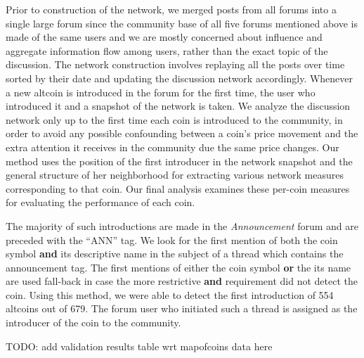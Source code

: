Prior to construction of the network, we merged posts from all forums into a
single large forum since the community base of all five forums mentioned
above is made of the same users and we are mostly concerned about influence and
aggregate information flow among users, rather than the exact topic of the discussion.
The network construction involves replaying all the posts over time sorted by their date and updating the
discussion network accordingly. Whenever a new altcoin is introduced
in the forum for the first time, the user who introduced it and a snapshot of the network is taken. 
We analyze the discussion network only up to the first time each coin is introduced to the community, in order to avoid any possible confounding between a coin's price movement and the extra attention it receives in the community due the same price changes. Our method uses the position of the first introducer in the network snapshot and the general structure of her neighborhood for extracting various network measures corresponding to that coin. Our final analysis examines these per-coin measures for evaluating the performance of each coin.



The  majority of such introductions are made in the \textit{Announcement} forum and are preceded with the ``ANN'' tag. We look for the first mention of both the coin symbol \textbf{and} its descriptive name in the subject of a thread which contains the announcement tag. The first mentions of either the coin symbol \textbf{or} the its name are used fall-back in case the more restrictive \textbf{and} requirement did not detect the coin. 
Using this method, we were able to detect the first introduction of 554 altcoins out of 679.
The forum user who initiated such a thread is assigned as the introducer of the coin to the community.

TODO: add validation results table wrt mapofcoins data here
